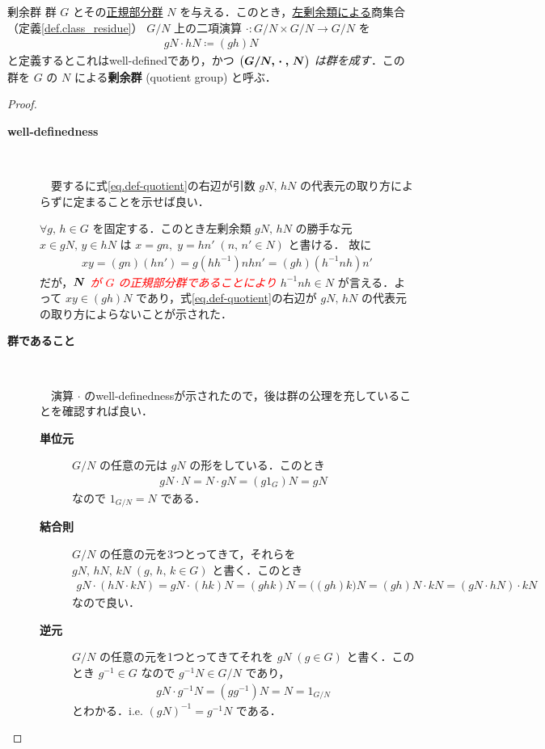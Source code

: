 \documentclass[geometry_main]{subfiles}
\begin{document}
\begin{mytheo}[label=def.quotient_group]{剰余群}
	群 $G$ とその\underline{正規部分群} $N$ を与える．このとき，\underline{左剰余類による}商集合（定義\ref{def.class_residue}） $G/N$ 上の二項演算 $\cdot\mathrel{} \colon G/N \times G/N \to G/N$ を
	\begin{align}
		\label{eq.def-quotient}
		gN \cdot hN \coloneqq (gh)N
	\end{align}
	と定義するとこれはwell-definedであり，かつ\emph{ $\vb*{\bigl( G/N,\, \cdot\mathrel{},\, N \bigr)}$ は群を成す}．この群を $G$ の $N$ による\textbf{剰余群} (quotient group) と呼ぶ．
\end{mytheo}

\begin{proof}
	\begin{description}
		\item[\textbf{well-definedness}]　
		
		　要するに式\eqref{eq.def-quotient}の右辺が引数 $gN,\, hN$ の代表元の取り方によらずに定まることを示せば良い．

		$\forall g,\, h \in G$ を固定する．このとき左剰余類 $gN,\, hN$ の勝手な元 $x \in gN,\, y \in hN$ は $x = gn,\; y = hn'\; (n,\, n' \in N)$ と書ける．
		故に
		\begin{align}
			xy = (gn)(hn') = g(hh^{-1})nhn' = (gh)(h^{-1}nh)n'
		\end{align}
		だが，\textcolor{red}{\emph{$\vb*{N}$ が $G$ の正規部分群であることにより}} $h^{-1}nh \in N$ が言える．よって $xy \in (gh)N$ であり，式\eqref{eq.def-quotient}の右辺が $gN,\, hN$ の代表元の取り方によらないことが示された．

		\item[\textbf{群であること}]　
		
		　演算 $\cdot$ のwell-definednessが示されたので，後は群の公理を充していることを確認すれば良い．
		\begin{description}
			\item[\textbf{単位元}] $G/N$ の任意の元は $gN$ の形をしている．このとき
			\begin{align}
				gN \cdot N = N \cdot gN = (g 1_G) N = gN
			\end{align}
			なので $1_{G/N} = N$ である．
			\item[\textbf{結合則}] $G/N$ の任意の元を3つとってきて，それらを $gN,\, hN,\, kN\; (g,\, h,\, k \in G)$ と書く．このとき
			\begin{align}
				gN \cdot (hN \cdot kN) = gN \cdot (hk)N = (ghk) N = \bigl( (gh)k \bigr) N = (gh)N \cdot kN = (gN \cdot hN) \cdot kN
			\end{align}
			なので良い．
			\item[\textbf{逆元}] $G/N$ の任意の元を1つとってきてそれを $gN\; (g \in G)$ と書く．このとき $g^{-1} \in G$ なので $g^{-1}N \in G/N$ であり，
			\begin{align}
				gN \cdot g^{-1}N = (gg^{-1}) N = N = 1_{G/N}
			\end{align}
			とわかる．i.e. $(gN)^{-1} = g^{-1}N$ である．
		\end{description}
	\end{description}
\end{proof}
\end{document}
